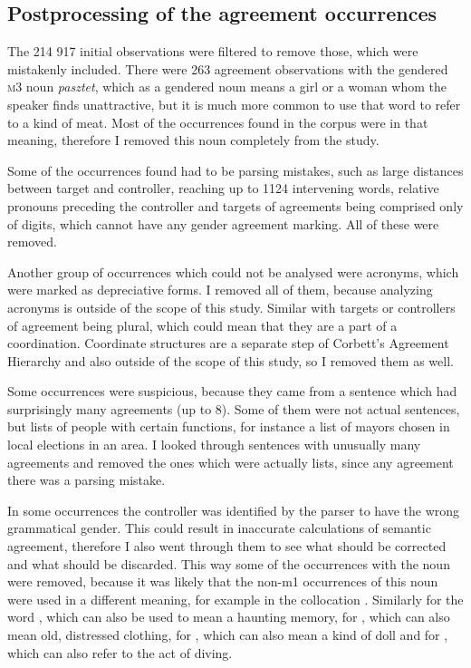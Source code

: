 \subsection{Postprocessing of the agreement occurrences}
The 214 917 initial observations were filtered to remove those, which were mistakenly included. There were 263 agreement observations with the gendered \textsc {m3} noun \textsl{pasztet}, which as a gendered noun means a girl or a woman whom the speaker finds unattractive, but it is much more common to use that word to refer to a kind of meat. Most of the occurrences found in the corpus were in that meaning, therefore I removed this noun completely from the study.

Some of the occurrences found had to be parsing mistakes, such as large distances between target and controller, reaching up to 1124 intervening words, relative pronouns preceding the controller and targets of agreements being comprised only of digits, which cannot have any gender agreement marking. All of these were removed.

Another group of occurrences which could not be analysed were acronyms, which were marked as depreciative forms. I removed all of them, because analyzing acronyms is outside of the scope of this study. Similar with targets or controllers of agreement being plural, which could mean that they are a part of a coordination. Coordinate structures are a separate step of Corbett's Agreement Hierarchy and also outside of the scope of this study, so I removed them as well.

Some occurrences were suspicious, because they came from a sentence which had surprisingly many agreements (up to 8). Some of them were not actual sentences, but lists of people with certain functions, for instance a list of mayors chosen in local elections in an area. I looked through sentences with unusually many agreements and removed the ones which were actually lists, since any agreement there was a parsing mistake.

In some occurrences the controller was identified by the parser to have the wrong grammatical gender. This could result in inaccurate calculations of semantic agreement, therefore I also went through them to see what should be corrected and what should be discarded. This way some of the occurrences with the noun  were removed, because it was likely that the non-m1 occurrences of this noun were used in a different meaning, for example in the collocation . Similarly for the word , which can also be used to mean a haunting memory, for , which can also mean old, distressed clothing, for , which can also mean a kind of doll and for , which can also refer to the act of diving.

